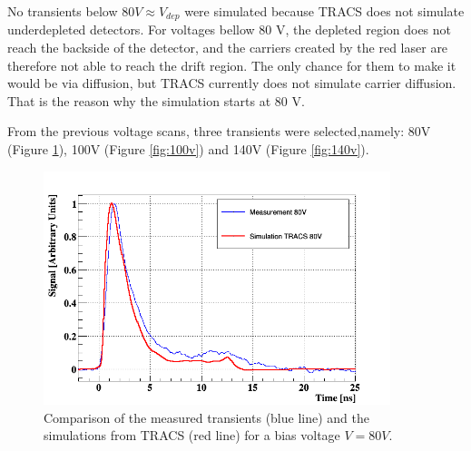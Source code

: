 No transients below $80V \approx V_{dep}$ were simulated because TRACS does not simulate underdepleted detectors. For voltages bellow 80 V, the depleted region does not reach the backside of the detector, and the carriers created by the red laser are therefore not able to reach the drift region. The only chance for them to make it would be via diffusion, but TRACS currently does not simulate carrier diffusion. That is the reason why the simulation starts at 80 V.


From the previous voltage scans, three transients were selected,namely: 80V (Figure \ref{fig:80v}), 100V (Figure \ref{fig:100v}) and 140V (Figure \ref{fig:140v}). 

\begin{figure}[H]
	\centering
	\includegraphics[width=0.9\textwidth]{80V.png}
	\caption{Comparison of the measured transients (blue line) and the simulations from TRACS (red line) for a bias voltage $V = 80V$.}
	\label{fig:80v} 
\end{figure}


